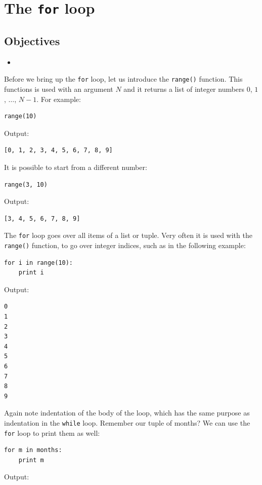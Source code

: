 \documentclass[article,A4,12pt]{llncs}
\begin{document}
\section{The {\tt for} loop} \label{sec:forloop}

\subsection{Objectives}

\begin{itemize}
\item
\end{itemize}

Before we bring up the {\tt for} loop, let us introduce the {\tt range()}
function. This functions is used with an argument $N$ and it returns 
a list of integer numbers $0$, $1$, $\ldots$, $N-1$. For example:

\begin{verbatim}
range(10)
\end{verbatim}
Output:

\begin{verbatim}
[0, 1, 2, 3, 4, 5, 6, 7, 8, 9]
\end{verbatim}
It is possible to start from a different number:

\begin{verbatim}
range(3, 10)
\end{verbatim}
Output:

\begin{verbatim}
[3, 4, 5, 6, 7, 8, 9]
\end{verbatim}
The {\tt for} loop goes over all items of a list or tuple.
Very often it is used with the {\tt range()} function, to go over 
integer indices, such as in the following example:

\begin{verbatim}
for i in range(10):
    print i
\end{verbatim}
Output:

\begin{verbatim}
0
1
2
3
4
5
6
7
8
9
\end{verbatim}
Again note indentation of the body of the loop, which has the same 
purpose as indentation in the {\tt while} loop. Remember our tuple
of months? We can use the {\tt for} loop to print them as well:

\begin{verbatim}
for m in months:
    print m
\end{verbatim}
Output:
\end{document}
